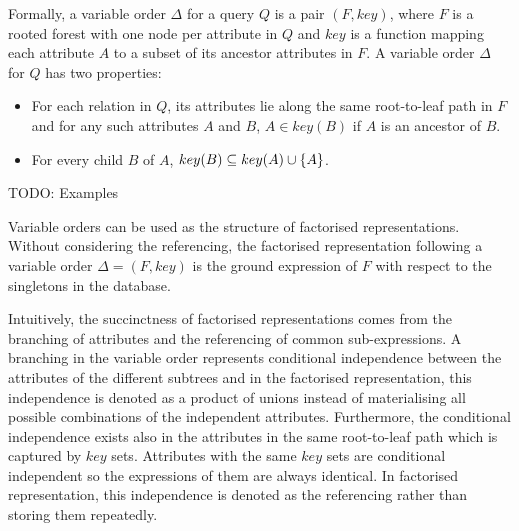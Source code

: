 Formally, a variable order $\Delta$ for a query $Q$ is a pair $(F, key)$, where $F$ is a rooted forest with one node per attribute in $Q$ and $key$ is a function mapping each attribute $A$ to a subset of its ancestor attributes in $F$. A variable order $\Delta$ for $Q$ has two properties:

\begin{itemize}
  \item For each relation in $Q$, its attributes lie along the same root-to-leaf path in $F$ and for any such attributes $A$ and $B$, $A \in key(B)$ if $A$ is an ancestor of $B$. 
  \item For every child $B$ of $A$, $key(B) \subseteq key(A) \cup \{A\}$. 
\end{itemize}

TODO:
Examples

Variable orders can be used as the structure of factorised representations. Without considering the referencing, the factorised representation following a variable order $\Delta = (F, key)$ is the ground expression of $F$ with respect to the singletons in the database. 

Intuitively, the succinctness of factorised representations comes from the branching of attributes and the referencing of common sub-expressions. A branching in the variable order represents conditional independence between the attributes of the different subtrees and in the factorised representation, this independence is denoted as a product of unions instead of materialising all possible combinations of the independent attributes. Furthermore, the conditional independence exists also in the attributes in the same root-to-leaf path which is captured by $key$ sets. Attributes with the same $key$ sets are conditional independent so the expressions of them are always identical. In factorised representation, this independence is denoted as the referencing rather than storing them repeatedly. 













